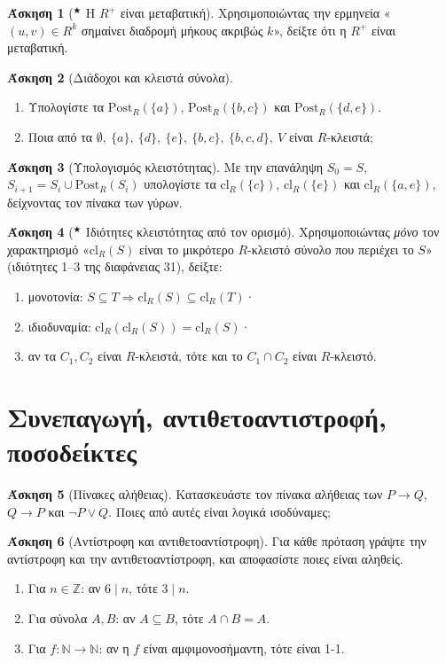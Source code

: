 \documentclass[11pt,a4paper]{article}
\theoremstyle{definition}
\newtheorem{question}{Άσκηση}
\newcommand{\N}{\mathbb{N}}
\newcommand{\Z}{\mathbb{Z}}
\newcommand{\Post}{\mathrm{Post}_R}
\newcommand{\cl}{\mathrm{cl}_R}
\newcommand{\st}{$^{\bigstar}$}  %
\newcommand{\gi}[1]{\item[(#1)]}
\begin{document}
\begin{question}[\st{} Η $R^+$ είναι μεταβατική]
Χρησιμοποιώντας την ερμηνεία «$(u,v)\in R^k$ σημαίνει διαδρομή μήκους ακριβώς $k$», δείξτε ότι η
$R^+$ είναι μεταβατική.
\end{question}


\begin{question}[Διάδοχοι και κλειστά σύνολα]
\begin{enumerate}[itemsep=0pt]
\gi{α} Υπολογίστε τα $\Post(\{a\})$, $\Post(\{b,c\})$ και $\Post(\{d,e\})$.
\gi{β} Ποια από τα $\emptyset,\ \{a\},\ \{d\},\ \{e\},\ \{b,c\},\ \{b,c,d\},\ V$ είναι $R$-κλειστά;
\end{enumerate}
\end{question}


\begin{question}[Υπολογισμός κλειστότητας]
Με την επανάληψη $S_0=S$, $S_{i+1}=S_i\cup\Post(S_i)$ υπολογίστε τα
$\cl(\{c\})$, $\cl(\{e\})$ και $\cl(\{a,e\})$, δείχνοντας τον πίνακα των γύρων.
\end{question}


\begin{question}[\st{} Ιδιότητες κλειστότητας από τον ορισμό]
Χρησιμοποιώντας \emph{μόνο} τον χαρακτηρισμό «$\cl(S)$ είναι το μικρότερο $R$-κλειστό σύνολο που
περιέχει το $S$» (ιδιότητες 1–3 της διαφάνειας 31), δείξτε:
\begin{enumerate}[itemsep=0pt]
\gi{α} μονοτονία: $S\subseteq T\Rightarrow \cl(S)\subseteq\cl(T)$·
\gi{β} ιδιοδυναμία: $\cl(\cl(S))=\cl(S)$·
\gi{γ} αν τα $C_1,C_2$ είναι $R$-κλειστά, τότε και το $C_1\cap C_2$ είναι $R$-κλειστό.
\end{enumerate}
\end{question}


\section{Συνεπαγωγή, αντιθετοαντιστροφή, ποσοδείκτες}

\begin{question}[Πίνακες αλήθειας]
Κατασκευάστε τον πίνακα αλήθειας των $P\to Q$, $Q\to P$ και $\neg P\vee Q$.
Ποιες από αυτές είναι λογικά ισοδύναμες;
\end{question}


\begin{question}[Αντίστροφη και αντιθετοαντίστροφη]
Για κάθε πρόταση γράψτε την αντίστροφη και την αντιθετοαντίστροφη, και αποφασίστε ποιες
είναι αληθείς.
\begin{enumerate}[itemsep=0pt]
\gi{α} Για $n\in\Z$: αν $6\mid n$, τότε $3\mid n$.
\gi{β} Για σύνολα $A,B$: αν $A\subseteq B$, τότε $A\cap B=A$.
\gi{γ} Για $f:\N\to\N$: αν η $f$ είναι αμφιμονοσήμαντη, τότε είναι 1-1.
\end{enumerate}
\end{question}
\end{document}
